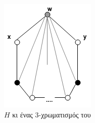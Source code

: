 \documentclass[a4paper, oneside, 11pt]{article}
\theoremstyle{definition}
\begin{document}
\begin{enumerate}
\begin{itemize}
\begin{itemize}
\begin{figure}
\begin{subfigure}[b]{0.3\textwidth}
                  \includegraphics[width=\textwidth]{./pics/fig2.png}
                  \caption{$H$ κι ένας 3-χρωματισμός του}
                  \label{fig2.11.2}
               \end{subfigure}
               ~
               \begin{subfigure}[b]{0.3\textwidth}

\end{subfigure}
\end{figure}
\end{itemize}
\end{itemize}
\end{enumerate}
\end{document}
